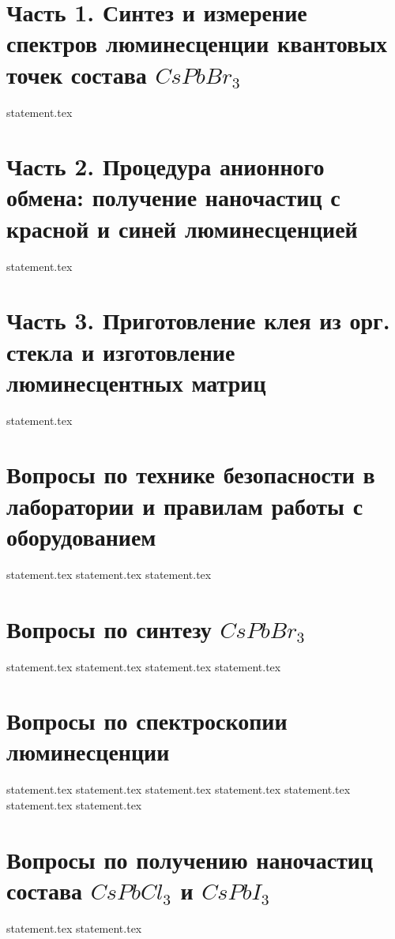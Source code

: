 \section{Часть 1. Синтез и измерение спектров люминесценции
квантовых точек состава $CsPbBr_3$}

{statement.tex}

\section{Часть 2. Процедура анионного обмена: получение наночастиц с красной и синей люминесценцией}

{statement.tex}

\section{Часть 3. Приготовление клея из орг. стекла и изготовление люминесцентных матриц}

{statement.tex}

\section{Вопросы по технике безопасности в лаборатории и правилам работы с оборудованием}

{statement.tex}
{statement.tex}
{statement.tex}

\section{Вопросы по синтезу $CsPbBr_3$}
{statement.tex}
{statement.tex}
{statement.tex}
{statement.tex}

\section{Вопросы по спектроскопии люминесценции}

{statement.tex}
{statement.tex}
{statement.tex}
{statement.tex}
{statement.tex}
{statement.tex}
{statement.tex}

\section{Вопросы по получению наночастиц состава $CsPbCl_3$ и $CsPbI_3$}

{statement.tex}
{statement.tex}